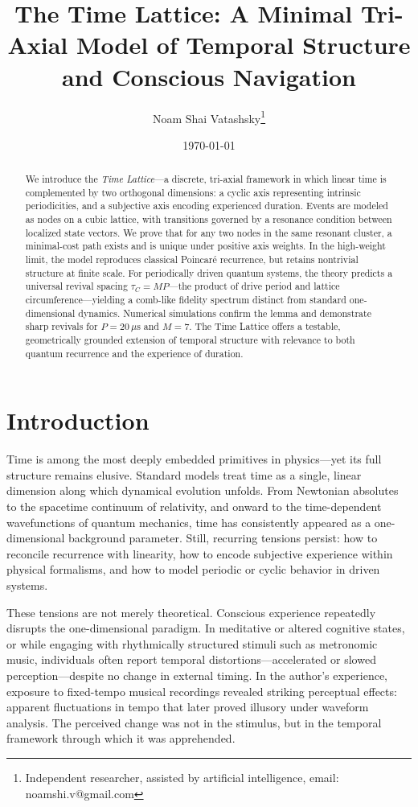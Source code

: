 \documentclass[11pt]{article}
\title{The Time Lattice: A Minimal Tri-Axial Model of Temporal Structure and Conscious Navigation}
\author{Noam Shai Vatashsky\thanks{Independent researcher, assisted by artificial intelligence, email: noamshi.v@gmail.com}}
\date{\today}
\begin{document}
\maketitle

\begin{abstract}
We introduce the \textit{Time Lattice}—a discrete, tri-axial framework in which linear time is complemented by two orthogonal dimensions: a cyclic axis representing intrinsic periodicities, and a subjective axis encoding experienced duration. Events are modeled as nodes on a cubic lattice, with transitions governed by a resonance condition between localized state vectors. We prove that for any two nodes in the same resonant cluster, a minimal-cost path exists and is unique under positive axis weights. In the high-weight limit, the model reproduces classical Poincaré recurrence, but retains nontrivial structure at finite scale. For periodically driven quantum systems, the theory predicts a universal revival spacing $\tau_C = MP$—the product of drive period and lattice circumference—yielding a comb-like fidelity spectrum distinct from standard one-dimensional dynamics. Numerical simulations confirm the lemma and demonstrate sharp revivals for $P = 20\,\mu\text{s}$ and $M = 7$. The Time Lattice offers a testable, geometrically grounded extension of temporal structure with relevance to both quantum recurrence and the experience of duration.
\end{abstract}

\section{Introduction}

Time is among the most deeply embedded primitives in physics—yet its full structure remains elusive. Standard models treat time as a single, linear dimension along which dynamical evolution unfolds. From Newtonian absolutes to the spacetime continuum of relativity, and onward to the time-dependent wavefunctions of quantum mechanics, time has consistently appeared as a one-dimensional background parameter. Still, recurring tensions persist: how to reconcile recurrence with linearity, how to encode subjective experience within physical formalisms, and how to model periodic or cyclic behavior in driven systems.

These tensions are not merely theoretical. Conscious experience repeatedly disrupts the one-dimensional paradigm. In meditative or altered cognitive states, or while engaging with rhythmically structured stimuli such as metronomic music, individuals often report temporal distortions—accelerated or slowed perception—despite no change in external timing. In the author’s experience, exposure to fixed-tempo musical recordings revealed striking perceptual effects: apparent fluctuations in tempo that later proved illusory under waveform analysis. The perceived change was not in the stimulus, but in the temporal framework through which it was apprehended.
\end{document}
